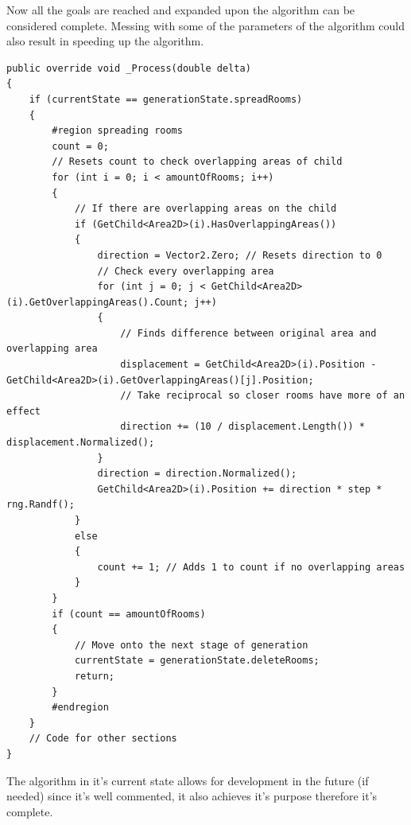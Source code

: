 \documentclass{article}
\begin{document}
Now all the goals are reached and expanded upon the algorithm can be considered complete. Messing with some of the parameters of the algorithm could also result in speeding up the algorithm.
\begin{lstlisting}
public override void _Process(double delta)
{
    if (currentState == generationState.spreadRooms)
    {
        #region spreading rooms
        count = 0; 
        // Resets count to check overlapping areas of child
        for (int i = 0; i < amountOfRooms; i++)
        {
            // If there are overlapping areas on the child
            if (GetChild<Area2D>(i).HasOverlappingAreas()) 
            {
                direction = Vector2.Zero; // Resets direction to 0
                // Check every overlapping area
                for (int j = 0; j < GetChild<Area2D>(i).GetOverlappingAreas().Count; j++) 
                {
                    // Finds difference between original area and overlapping area
                    displacement = GetChild<Area2D>(i).Position - GetChild<Area2D>(i).GetOverlappingAreas()[j].Position;
                    // Take reciprocal so closer rooms have more of an effect
                    direction += (10 / displacement.Length()) * displacement.Normalized(); 
                }
                direction = direction.Normalized();
                GetChild<Area2D>(i).Position += direction * step * rng.Randf();
            }
            else
            {
                count += 1; // Adds 1 to count if no overlapping areas
            }
        }
        if (count == amountOfRooms)
        {
            // Move onto the next stage of generation
            currentState = generationState.deleteRooms;
            return;
        }
        #endregion
    }
    // Code for other sections
}

\end{lstlisting}
The algorithm in it's current state allows for development in the future (if needed) since it's well commented, it also achieves it's purpose therefore it's complete. 
\end{document}
